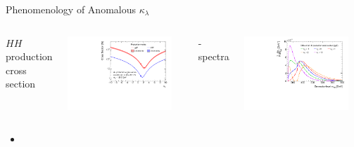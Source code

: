 \documentclass[11pt, xcolor={dvipsnames}, aspectratio=169]{beamer}
\begin{document}
\begin{frame}{Phenomenology of Anomalous $\kappa_{\lambda}$}
  \begin{columns}
    \centering

    $HH$ production cross section

    \includegraphics[width=0.9\textwidth]{self_coupling/hh_xsec}

    \centering

    \mHH-spectra

    \includegraphics[width=0.9\textwidth]{self_coupling/hh_mhh_vs_klam}
  \end{columns}

  \begin{itemize}
  \item
  \end{itemize}
\end{frame}

\end{document}
